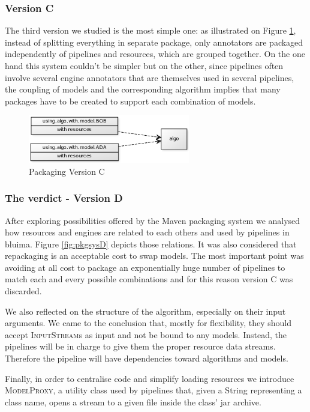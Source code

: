 \documentclass{article}
\newcommand{\id}[1]{\mbox{\textsc{#1}}}
\begin{document}
\subsubsection{Version C}

The third version we studied is the most simple one: as illustrated on Figure \ref{fig:pkgsysC}, instead of splitting everything in separate package, only annotators are packaged independently of pipelines and resources, which are grouped together. On the one hand this system couldn't be simpler but on the other, since pipelines often involve several engine annotators that are themselves used in several pipelines, the coupling of models and the corresponding algorithm implies that many packages have to be created to support each combination of models.


\begin{figure}
\centering
\includegraphics[width=200pt]{res/packaging_version_C.png}
\caption{Packaging Version C}
\label{fig:pkgsysC}
\end{figure}

\subsubsection{The verdict - Version D}

After exploring possibilities offered by the Maven packaging system we analysed how resources and engines are related to each others and used by pipelines in bluima. Figure \ref{fig:pkgsysD} depicts those relations. It was also considered that repackaging is an acceptable cost to swap models. The most important point was avoiding at all cost to package an exponentially huge number of pipelines to match each and every possible combinations and for this reason version C was discarded.

We also reflected on the structure of the algorithm, especially on their input arguments. We came to the conclusion that, mostly for flexibility, they should accept \id{InputStream}s as input and not be bound to any models. Instead, the pipelines will be in charge to give them the proper resource data streams. Therefore the pipeline will have dependencies toward algorithms and models.

Finally, in order to centralise code and simplify loading resources we introduce \id{ModelProxy}, a utility class used by pipelines that, given a String representing a class name, opens a stream to a given file inside the class' jar archive.
\end{document}
